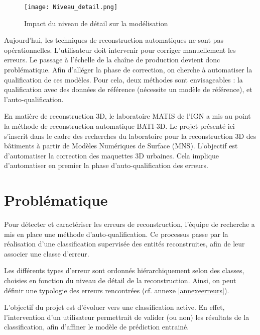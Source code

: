 \begin{figure}[!h]
	\begin{center}
		\texttt{[image: Niveau\_detail.png]}  \\
		\caption[Impact du niveau de détail sur la modélisation]{Impact du niveau de détail sur la modélisation\footnotemark{}}
		\label{fig:LOD}
	\end{center}
\end{figure}

Aujourd'hui, les techniques de reconstruction automatiques ne sont pas opérationnelles. L’utilisateur doit intervenir pour corriger manuellement les erreurs. Le passage à l'échelle de la chaîne de production devient donc problématique. Afin d'alléger la phase de correction, on cherche à automatiser la qualification de ces modèles. Pour cela, deux méthodes sont envisageables : la qualification avec des données de référence (nécessite un modèle de référence), et l’auto-qualification. \newline

En matière de reconstruction 3D, le laboratoire MATIS de l'IGN a mis au point la méthode de reconstruction automatique BATI-3D. Le projet présenté ici s’inscrit dans le cadre des recherches du laboratoire pour la reconstruction 3D des bâtiments à partir de Modèles Numériques de Surface (MNS). L'objectif est d'automatiser la correction des maquettes 3D urbaines. Cela implique d'automatiser en premier la phase d'auto-qualification des erreurs.

\section{Problématique}

Pour détecter et caractériser les erreurs de reconstruction, l’équipe de recherche a mis en place une méthode d'auto-qualification. Ce processus passe par la réalisation d'une classification supervisée des entités reconstruites, afin de leur associer une classe d'erreur. \newline

Les différents types d'erreur sont ordonnés hiérarchiquement selon des classes, choisies en fonction du niveau de détail de la reconstruction. Ainsi, on peut définir une typologie des erreurs rencontrées (cf. annexe \ref{annexeerreurs}).\newline

L'objectif du projet est d'évoluer vers une classification active. En effet, l'intervention d'un utilisateur permettrait de valider (ou non) les résultats de la classification, afin d'affiner le modèle de prédiction entrainé.\newline
 
